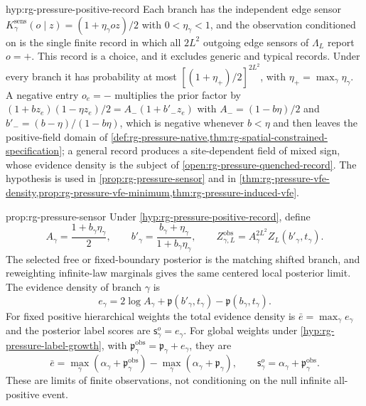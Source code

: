 {hyp:rg-pressure-positive-record}
Each branch has the independent edge sensor
$K^{\mathrm{sens}}_\gamma(o\mid z)=(1+\eta_\gamma oz)/2$ with
$0<\eta_\gamma<1$, and the observation conditioned on is the single finite
record in which all $2L^2$ outgoing edge sensors of $\Lambda_L$ report
$o=+$. This record is a choice, and it excludes generic and typical records.
Under every branch it has probability at most
$[(1+\eta_+)/2]^{2L^2}$, with $\eta_+=\max_\gamma\eta_\gamma$. A negative entry
$o_e=-$ multiplies the prior factor by
$(1+bz_e)(1-\eta z_e)/2=A_-(1+b'_-z_e)$ with $A_-=(1-b\eta)/2$ and
$b'_-=(b-\eta)/(1-b\eta)$, which is negative whenever $b<\eta$ and then
leaves the positive-field domain of
\cref{def:rg-pressure-native,thm:rg-spatial-constrained-specification}; a
general record produces a site-dependent field of mixed sign, whose evidence
density is the subject of \cref{open:rg-pressure-quenched-record}. The
hypothesis is used in \cref{prop:rg-pressure-sensor} and in
\cref{thm:rg-pressure-vfe-density,prop:rg-pressure-vfe-minimum,thm:rg-pressure-induced-vfe}.

{prop:rg-pressure-sensor}
Under \cref{hyp:rg-pressure-positive-record}, define
\begin{equation}
 A_\gamma=\frac{1+b_\gamma\eta_\gamma}{2},\qquad
 b'_\gamma=\frac{b_\gamma+\eta_\gamma}{1+b_\gamma\eta_\gamma},\qquad
 Z^{\mathrm{obs}}_{\gamma,L}
 =A_\gamma^{2L^2}Z_L(b'_\gamma,t_\gamma).
 \label{eq:rg-pressure-sensor}
\end{equation}
The selected free or fixed-boundary posterior is the matching shifted branch,
and reweighting infinite-law marginals gives the same centered local
posterior limit. The evidence density of branch $\gamma$ is
\begin{equation}
 e_\gamma=2\log A_\gamma+
 \mathfrak p(b'_\gamma,t_\gamma)-\mathfrak p(b_\gamma,t_\gamma).
 \label{eq:rg-pressure-evidence}
\end{equation}
For fixed positive hierarchical weights the total evidence density is
$\bar e=\max_\gamma e_\gamma$ and the posterior label scores are
$\mathsf s^o_\gamma=e_\gamma$. For global weights under
\cref{hyp:rg-pressure-label-growth}, with
$\mathfrak p^{\mathrm{obs}}_\gamma=\mathfrak p_\gamma+e_\gamma$, they are
\begin{equation}
 \bar e=\max_\gamma(\alpha_\gamma+\mathfrak p_\gamma^{\mathrm{obs}})
   -\max_\gamma(\alpha_\gamma+\mathfrak p_\gamma),\qquad
 \mathsf s^o_\gamma=\alpha_\gamma+\mathfrak p_\gamma^{\mathrm{obs}}.
 \label{eq:rg-pressure-evidence-global}
\end{equation}
These are limits of finite observations, not conditioning on the null
infinite all-positive event. 

